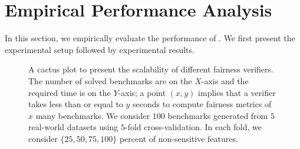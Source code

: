 \section{Empirical Performance Analysis}
\label{fvgm_sec:experiments}
In this section, we empirically evaluate the performance of {\fvgm}. We first present the experimental setup  followed by experimental results.

\begin{figure}
	\begin{center}		
	\end{center}
	\caption[Scalability of {\fvgm}]{A cactus plot to present the scalability of different fairness verifiers. The number of solved benchmarks are on the $ X $-axis and the required time is on the $ Y $-axis; a point $ (x,y) $ implies that a verifier takes less than or equal to $ y $ seconds to compute fairness metrics of $ x $ many benchmarks. We consider $ 100 $ benchmarks generated from $ 5 $ real-world datasets using $ 5 $-fold cross-validation. In each fold, we consider $\{25, 50, 75, 100\} $ percent of non-sensitive features.}\label{fvgm_fig:scalability_exp}
\end{figure}

